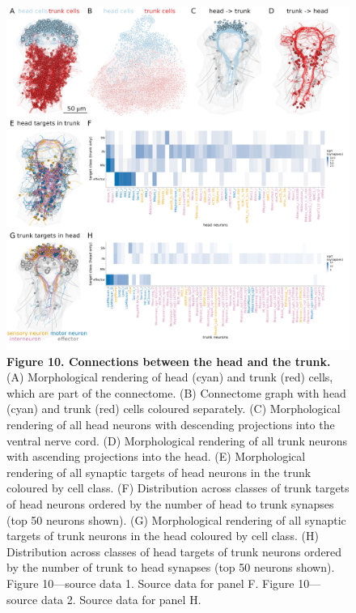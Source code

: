 \documentclass[
  11pt,
]{article}
\begin{document}
\begin{figure}[H]

{\centering \includegraphics[width=1\textwidth,height=\textheight]{Figures/Figure10.png}

}

\caption{\textbf{Figure 10. Connections between the head and the trunk.
} (A) Morphological rendering of head (cyan) and trunk (red) cells,
which are part of the connectome. (B) Connectome graph with head (cyan)
and trunk (red) cells coloured separately. (C) Morphological rendering
of all head neurons with descending projections into the ventral nerve
cord. (D) Morphological rendering of all trunk neurons with ascending
projections into the head. (E) Morphological rendering of all synaptic
targets of head neurons in the trunk coloured by cell class. (F)
Distribution across classes of trunk targets of head neurons ordered by
the number of head to trunk synapses (top 50 neurons shown). (G)
Morphological rendering of all synaptic targets of trunk neurons in the
head coloured by cell class. (H) Distribution across classes of head
targets of trunk neurons ordered by the number of trunk to head synapses
(top 50 neurons shown). Figure 10---source data 1. Source data for panel
F. Figure 10---source data 2. Source data for panel H.}

\end{figure}%
\end{document}
